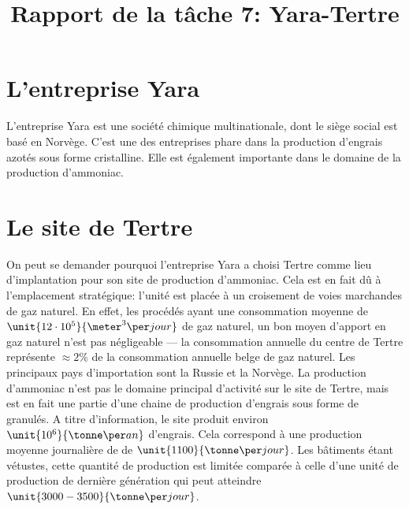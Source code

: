

\title{Rapport de la tâche 7: Yara-Tertre}
\maketitle
\newpage
\section*{L'entreprise Yara}
L'entreprise Yara est une société chimique multinationale, dont le siège social est basé en Norvège. C'est une des entreprises phare dans la production d'engrais azotés sous forme cristalline. Elle est également importante dans le domaine de la production d'ammoniac.
\section*{Le site de Tertre}
On peut se demander pourquoi l'entreprise Yara a choisi Tertre comme lieu d'implantation pour son site de production d'ammoniac. Cela est en fait dû à l'emplacement stratégique: l'unité est placée à un croisement de voies marchandes de gaz naturel. En effet, les procédés ayant une consommation moyenne de $\unit{12 \cdot 10^5}{\meter^3\per jour}$ de gaz naturel, un bon moyen d'apport en gaz naturel n'est pas négligeable --- la consommation annuelle du centre de Tertre représente $\approx 2\%$ de la consommation annuelle belge de gaz naturel. Les principaux pays d'importation sont la Russie et la Norvège. La production d'ammoniac n'est pas le domaine principal d'activité sur le site de Tertre, mais est en fait une partie d'une chaine de production d'engrais sous forme de granulés. A titre d'information, le site produit environ $\unit{10^6}{\tonne\per an}$ d'engrais. Cela correspond à une production moyenne journalière de  de $\unit{1100}{\tonne\per jour}$. Les bâtiments étant vétustes, cette quantité de production est limitée comparée à celle d'une unité de production de dernière génération qui peut atteindre $\unit{3000-3500}{\tonne\per jour}$. 
